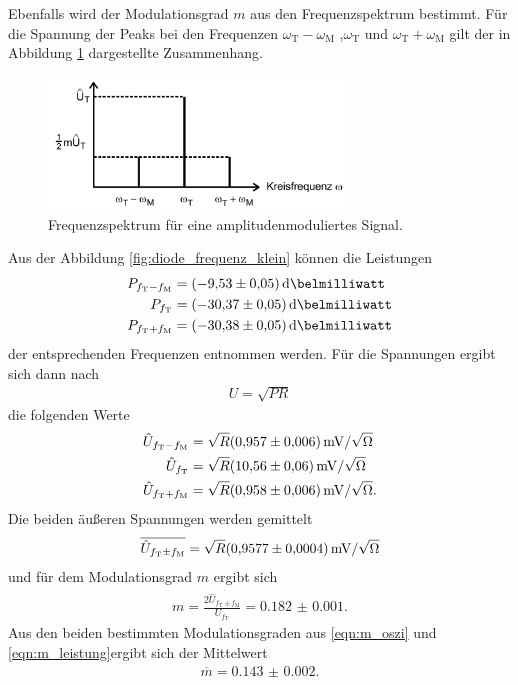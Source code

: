 Ebenfalls wird der Modulationsgrad $m$ aus den Frequenzspektrum bestimmt.
Für die Spannung der Peaks bei den Frequenzen $\omega_{\text{T}}-\omega_{\text{M}}$ ,$\omega_{\text{T}}$  und $\omega_{\text{T}}+\omega_{\text{M}}$
gilt der in Abbildung \ref{fig:2} dargestellte
Zusammenhang.

\begin{figure}
  \centering
  \includegraphics[width=0.7\textwidth]{figures/frequenzspektrum.PNG}
  \caption{Frequenzspektrum für eine amplitudenmoduliertes Signal.}
  \label{fig:2}
\end{figure}

Aus der Abbildung \ref{fig:diode_frequenz_klein} können die Leistungen
\begin{align}
P_{f_{\text{T}}-f_{\text{M}}}&=\SI{-9.53(5)}{\deci\belmilliwatt}\\
P_{f_{\text{T}}}&=\SI{-30.37(5)}{\deci\belmilliwatt}\\
P_{f_{\text{T}}+f_{\text{M}}}&=\SI{-30.38(5)}{\deci\belmilliwatt}
\end{align}
der entsprechenden Frequenzen entnommen werden.
Für die Spannungen ergibt sich dann nach
\begin{align}
  U= \sqrt{P R}
\end{align}
die folgenden Werte
\begin{align}
   \hat{U}_{f_{\text{T}}-f_{\text{M}}}&=\sqrt{R}\SI{0.957(6)}{\milli\volt\per\sqrt{\ohm}}\\
  \hat{U}_{f_{\text{T}}}&=\sqrt{R}\SI{10.56(6)}{\milli\volt\per\sqrt{\ohm}}\\
  \hat{U}_{f_{\text{T}}+f_{\text{M}}}&=\sqrt{R}\SI{0.958(6)}{\milli\volt\per\sqrt{\ohm}}.
\end{align}
Die beiden äußeren Spannungen werden gemittelt
\begin{align}
  \overline{\hat{U}_{f_{\text{T}}\pm f_{\text{M}}}} = \sqrt{R}\SI{0.9577(4)}{\milli\volt\per\sqrt{\ohm}}
\end{align}
und für
dem Modulationsgrad $m$ ergibt sich
\begin{align}
m=\frac{2\overline{\hat{U}_{f_{\text{T}}\pm f_{\text{M}}}}}{U_{f_{\text{T}}}} = \num{0.182(1)}. \label{eqn:m_leistung}
\end{align}
Aus den beiden bestimmten Modulationsgraden aus \eqref{eqn:m_oszi} und \eqref{eqn:m_leistung}ergibt sich der Mittelwert
\begin{align}
\overline{m}=\num{0.143(2)}.
\end{align}

